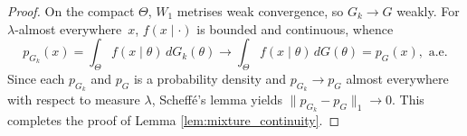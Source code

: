\documentclass[11pt,twoside]{article} %
\newtheorem{proposition}{Proposition}
\begin{document}
\begin{proof}
On the compact $\Theta$, $W_1$ metrises weak convergence, so $G_k\to G$ weakly. For $\lambda$-almost everywhere\ $x$,
$f(x\mid\cdot)$ is bounded and continuous, whence 
\begin{equation*}
    p_{G_k}(x)=\int_\Theta f(x\mid\theta)\,dG_k(\theta)\to
\int_\Theta f(x\mid\theta)\,dG(\theta)=p_G(x), \text{ a.e.}
\end{equation*}
Since each $p_{G_k}$ and $p_G$ is a probability density and $p_{G_k} \to p_G$ almost everywhere with respect to measure $\lambda$, Scheffé's lemma yields
$\|p_{G_k}-p_G\|_1\to0$. This completes the proof of Lemma \ref{lem:mixture_continuity}. 
\end{proof}








\end{document}
